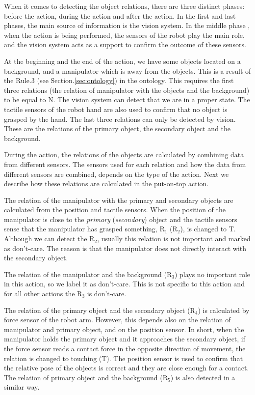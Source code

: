 When it comes to detecting the object relations, there are three distinct phases: before the action, during the action and after the action.
In the first and last phases, the main source of information is the vision system.
In the middle phase , when the action is being performed, the sensors of the robot play the main role,
and the vision system acts as a support to confirm the outcome of these sensors.

At the beginning and the end of the action, we have some objects located on a background, and a manipulator which is away from the objects.
This is a result of the Rule.3 (see Section.\ref{sec:ontology}) in the ontology.
This requires the first three relations (the relation of manipulator with the objects and the background) to be equal to N.
The vision system can detect that we are in a proper state.
The tactile sensors of the robot hand are also used to confirm that no object is grasped by the hand.
The last three relations can only be detected by vision.
These are the relations of the primary object, the secondary object and the background.

During the action, the relations of the objects are calculated by combining data from different sensors.
The sensors used for each relation and how the data from different sensors are combined, depends on the type of the action.
Next we describe how these relations are calculated in the put-on-top action.

The relation of the manipulator with the primary and secondary objects are calculated from the position and tactile sensors.
When the position of the manipulator is close to the \textit{primary} (\textit{secondary}) object and the tactile sensors sense that the manipulator has grasped something,
$\text{R}_1$ ($\text{R}_2$), is changed to T.
Although we can detect the $\text{R}_2$, usually this relation is not important and marked as don't-care.
The reason is that the manipulator does not directly interact with the secondary object.

The relation of the manipulator and the background ($\text{R}_3$) plays no important role in this action, so we label it as don't-care.
This is not specific to this action and for all other actions the $\text{R}_3$ is don't-care.


The relation of the primary object and the secondary object ($\text{R}_4$) is calculated by force sensor of the robot arm.
However, this depends also on the relation of manipulator and primary object, and on the position sensor.
In short, when the manipulator holds the primary object and it approaches the secondary object,
if the force sensor reads a contact force in the opposite direction of movement, the relation is changed to touching (T).
The position sensor is used to confirm that the relative pose of the objects is correct and they are close enough for a contact.
The relation of primary object and the background ($\text{R}_5$) is also detected in a similar way.

